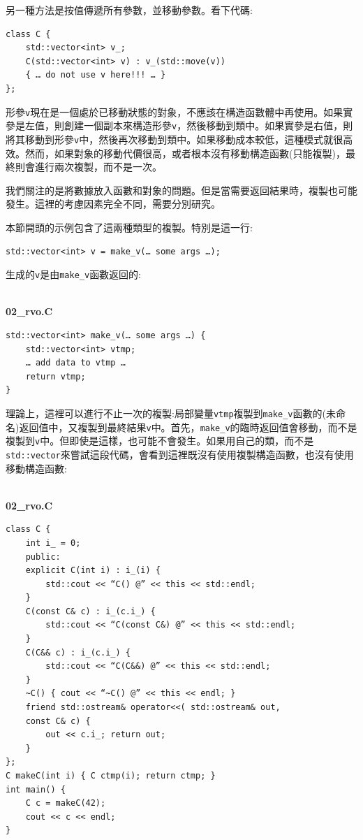 另一種方法是按值傳遞所有參數，並移動參數。看下代碼:

\begin{lstlisting}[style=styleCXX]
class C {
	std::vector<int> v_;
	C(std::vector<int> v) : v_(std::move(v)) 
	{ … do not use v here!!! … }
};
\end{lstlisting}

形參\texttt{v}現在是一個處於已移動狀態的對象，不應該在構造函數體中再使用。如果實參是左值，則創建一個副本來構造形參\texttt{v}，然後移動到類中。如果實參是右值，則將其移動到形參\texttt{v}中，然後再次移動到類中。如果移動成本較低，這種模式就很高效。然而，如果對象的移動代價很高，或者根本沒有移動構造函數(只能複製)，最終則會進行兩次複製，而不是一次。 

我們關注的是將數據放入函數和對象的問題。但是當需要返回結果時，複製也可能發生。這裡的考慮因素完全不同，需要分別研究。


本節開頭的示例包含了這兩種類型的複製。特別是這一行:

\begin{lstlisting}[style=styleCXX]
std::vector<int> v = make_v(… some args …);
\end{lstlisting}

生成的\texttt{v}是由\texttt{make\_v}函數返回的:

\hspace*{\fill} \\ %
\noindent
\textbf{02\_rvo.C}
\begin{lstlisting}[style=styleCXX]
std::vector<int> make_v(… some args …) {
	std::vector<int> vtmp;
	… add data to vtmp …
	return vtmp;
}
\end{lstlisting}

理論上，這裡可以進行不止一次的複製:局部變量\texttt{vtmp}複製到\texttt{make\_v}函數的(未命名)返回值中，又複製到最終結果\texttt{v}中。首先，\texttt{make\_v}的臨時返回值會移動，而不是複製到\texttt{v}中。但即使是這樣，也可能不會發生。如果用自己的類，而不是\texttt{std::vector}來嘗試這段代碼，會看到這裡既沒有使用複製構造函數，也沒有使用移動構造函數:

\hspace*{\fill} \\ %
\noindent
\textbf{02\_rvo.C}
\begin{lstlisting}[style=styleCXX]
class C {
	int i_ = 0;
	public:
	explicit C(int i) : i_(i) { 
		std::cout << “C() @” << this << std::endl;
	}
	C(const C& c) : i_(c.i_) {
		std::cout << “C(const C&) @” << this << std::endl;
	}
	C(C&& c) : i_(c.i_) {
		std::cout << “C(C&&) @” << this << std::endl;
	}
	~C() { cout << “~C() @” << this << endl; }
	friend std::ostream& operator<<( std::ostream& out,
	const C& c) {
		out << c.i_; return out;
	}
};  
C makeC(int i) { C ctmp(i); return ctmp; }
int main() {
	C c = makeC(42);
	cout << c << endl;
}
\end{lstlisting}


